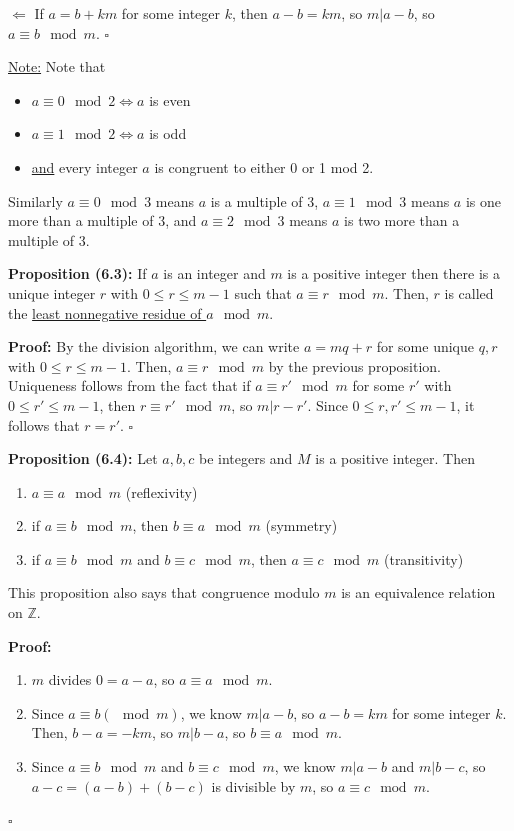 \documentclass{article}
\newcommand*{\qed}{\hfill$\square$}%
\newcommand*{\zz}{\mathbb{Z}}%
\begin{document}
$\Leftarrow$ If $a=b+km$ for some integer $k$, then $a-b=km$, so $m|a-b$, so $a\equiv b\mod m$. \qed

\underline{Note:} Note that \begin{itemize}
    \item $a\equiv 0\mod 2\iff a$ is even
    \item $a\equiv 1\mod 2\iff a$ is odd
    \item \underline{and} every integer $a$ is congruent to either 0 or 1 mod 2. 
\end{itemize} Similarly $a\equiv 0\mod 3$ means $a$ is a multiple of 3, $a\equiv 1\mod 3$ means $a$ is one more than a multiple of 3, and $a\equiv 2\mod 3$ means $a$ is two more than a multiple of 3.

\textbf{Proposition (6.3):} If $a$ is an integer and $m$ is a positive integer then there is a unique integer $r$ with $0\leq r\leq m-1$ such that $a\equiv r\mod m$. Then, $r$ is called the \underline{least nonnegative residue of $a\mod m$}.

\textbf{Proof:} By the division algorithm, we can write $a=mq+r$ for some unique $q,r$ with $0\leq r\leq m-1$. Then, $a\equiv r\mod m$ by the previous proposition. Uniqueness follows from the fact that if $a\equiv r'\mod m$ for some $r'$ with $0\leq r'\leq m-1$, then $r\equiv r'\mod m$, so $m|r-r'$. Since $0\leq r,r'\leq m-1$, it follows that $r=r'$. \qed

\textbf{Proposition (6.4):} Let $a,b,c$ be integers and $M$ is a positive integer. Then \begin{enumerate}
    \item $a\equiv a\mod m$ (reflexivity)
    \item if $a\equiv b\mod m$, then $b\equiv a\mod m$ (symmetry)
    \item if $a\equiv b\mod m$ and $b\equiv c\mod m$, then $a\equiv c\mod m$ (transitivity)
\end{enumerate}

This proposition also says that congruence modulo $m$ is an equivalence relation on $\zz$. 

\textbf{Proof:}\begin{enumerate}
    \item $m$ divides $0=a-a$, so $a\equiv a\mod m$.
    \item Since $a\equiv b(\mod m)$, we know $m|a-b$, so $a-b=km$ for some integer $k$. Then, $b-a=-km$, so $m|b-a$, so $b\equiv a\mod m$.
    \item Since $a\equiv b\mod m$ and $b\equiv c\mod m$, we know $m|a-b$ and $m|b-c$, so $a-c=(a-b)+(b-c)$ is divisible by $m$, so $a\equiv c\mod m$.
\end{enumerate}\qed
\end{document}
